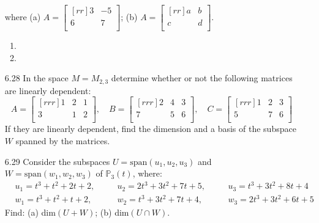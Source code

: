 \documentclass[12pt]{article}
\begin{document}
\begin{enumerate}
where (a) $A=\begin{bmatrix}[rr]3&-5\\6&7\\\end{bmatrix}$; (b) $A=\begin{bmatrix}[rr]a&b\\c&d\\\end{bmatrix}$.
	\begin{enumerate}
	\item
	\item
	\end{enumerate}
\item[6.28] In the space $M=M_{2,3}$ determine whether or not the following matrices are linearly dependent:
\[ A=\begin{bmatrix}[rrr]1&2&1\\3&1&2\\\end{bmatrix}, \quad B=\begin{bmatrix}[rrr]2&4&3\\7&5&6\\\end{bmatrix}, \quad C=\begin{bmatrix}[rrr]1&2&3\\5&7&6\\\end{bmatrix} \]
If they are linearly dependent, find the dimension and a basis of the subspace $W$ spanned by the matrices.

\item[6.29] Consider the subspaces $U=\mathrm{span}(u_1,u_2,u_3)$ and $W=\mathrm{span}(w_1,w_2,w_3)$ of $\mathbb{P}_3(t)$, where:
\begin{align*}
&u_1=t^3+t^2+2t+2, \quad &&u_2=2t^3+3t^2+7t+5, \quad &&u_3=t^3+3t^2+8t+4\\
&w_1=t^3+t^2+t+2, \quad &&w_2=t^3+3t^2+7t+4, \quad &&w_3=2t^3+3t^2+6t+5
\end{align*}
Find: (a) dim$(U+W)$; (b) dim$(U \cap W)$.


\end{enumerate}
\end{document}
